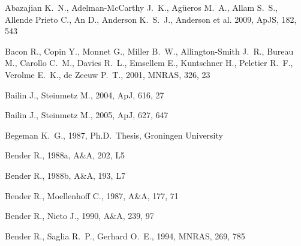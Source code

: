 \documentclass[usenatbib,usegraphicx]{mn2e}
\def\apj{ApJ}           %
\def\apjs{ApJS}         %
\def\aap{A\&A}          %
\def\mnras{MNRAS}       %
\begin{document}

%

\begin{thebibliography}{}

{Abazajian} K.~N.,  {Adelman-McCarthy} J.~K.,  {Ag{\"u}eros} M.~A.,  {Allam}
  S.~S.,  {Allende Prieto} C.,  {An} D.,  {Anderson} K.~S.~J.,  {Anderson}
  {et al.} 2009, \apjs, 182, 543

{Bacon} R.,  {Copin} Y.,  {Monnet} G.,  {Miller} B.~W.,  {Allington-Smith}
  J.~R.,  {Bureau} M.,  {Carollo} C.~M.,  {Davies} R.~L.,  {Emsellem} E.,
  {Kuntschner} H.,  {Peletier} R.~F.,  {Verolme} E.~K.,    {de Zeeuw} P.~T.,
  2001, \mnras, 326, 23

{Bailin} J.,  {Steinmetz} M.,  2004, \apj, 616, 27

{Bailin} J.,  {Steinmetz} M.,  2005, \apj, 627, 647

{Begeman} K.~G.,  1987, Ph.D.~Thesis, Groningen University

{Bender} R.,  1988a, \aap, 202, L5

{Bender} R.,  1988b, \aap, 193, L7

{Bender} R.,  {Moellenhoff} C.,  1987, \aap, 177, 71

{Bender} R.,  {Nieto} J.,  1990, \aap, 239, 97

{Bender} R.,  {Saglia} R.~P.,    {Gerhard} O.~E.,  1994, \mnras, 269, 785


\end{thebibliography}
\end{document}
